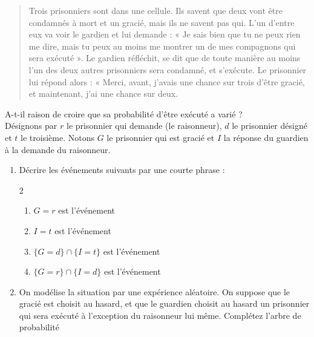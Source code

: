 \documentclass[main.tex]{subfiles}
\begin{document}
\begin{problem}\hfill 

\begin{quote}
	 Trois prisonniers sont dans une cellule. Ils savent que deux vont être condamnés à mort et un gracié, mais ils ne savent pas qui. L'un d'entre eux va voir le gardien et lui demande : « Je sais bien que tu ne peux rien me dire, mais tu peux au moins me montrer un de mes compagnons qui sera exécuté ». Le gardien réfléchit, se dit que de toute manière au moins l'un des deux autres prisonniers sera condamné, et s'exécute. Le prisonnier lui répond alors : « Merci, avant, j'avais une chance sur trois d'être gracié, et maintenant, j'ai une chance sur deux. 
\end{quote}

A-t-il raison de croire que sa probabilité d'être exécuté a varié ?\\
Désignons par $r$ le prisonnier qui demande (le raisonneur), $d$ le prisonnier désigné et $t$ le troisième. Notons $G$ le prisonnier qui est gracié et $I$ la réponse du guardien à la demande du raisonneur.
 
\begin{enumerate}[label=\arabic*), leftmargin=*]
	\item Décrire les événements suivants par une courte phrase :
	\vspace{-0.25em}
	\begin{spacing}{2}
	\begin{enumerate}[leftmargin=*,label={}]
		\item $G=r$ est l'événement \dotfill 
		\item $I=t$ est l'événement \dotfill 
		\item $\{G=d\} \cap \{I=t\}$ est l'événement \dotfill  
		\item $\{G=r\} \cap \{I=d\}$ est l'événement \dotfill  
	\end{enumerate}
	\end{spacing}
\vspace{-0.75em}
	\item On modélise la situation par une expérience aléatoire. On suppose  que le gracié est choisit au hasard, et que le guardien choisit au hasard un prisonnier qui sera exécuté à l'exception du raisonneur lui même. Complétez l'arbre de probabilité 
	

\end{enumerate}
\end{problem}
\end{document}
